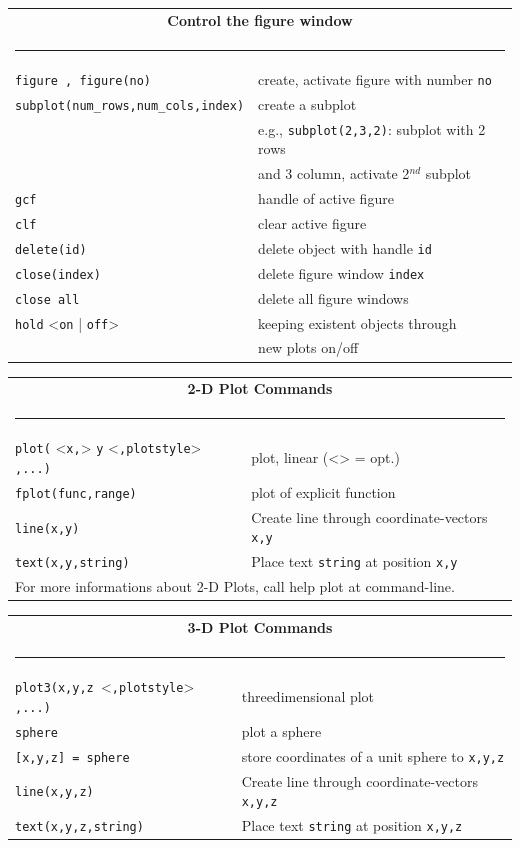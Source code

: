 \begin{tabular}{ll}
\multicolumn{2}{c}{\bf Control the figure window}\\
\multicolumn{2}{c}{\rule{0.97\textwidth}{0pt}}\\[-2ex]\hline
\verb/figure , figure(no)/ & create, activate figure with number \verb/no/\\
\verb/subplot(num_rows,num_cols,index)/ & create a subplot\\
& e.g., \verb/subplot(2,3,2)/: subplot with 2 rows\\
& and 3 column, activate 2$^{nd}$ subplot\\
\verb/gcf/ & handle of active figure\\
\verb/clf/ & clear active figure\\
\verb/delete(id)/ & delete object with handle \verb(id(\\
\verb/close(index)/ & delete figure window \verb(index(\\
\verb/close all /& delete all figure windows\\
\verb/hold/ <\verb/on/ | \verb/off/> & keeping existent objects through\\
& new plots on/off \\
\hline
\end{tabular}

\begin{tabular}{ll}
\multicolumn{2}{c}{\bf 2-D Plot Commands}\\
\multicolumn{2}{c}{\rule{0.97\textwidth}{0pt}}\\[-2ex]\hline
\verb/plot(/ <\verb/x,/> \verb/y/ <\verb/,plotstyle/> \verb/,...)/& plot, linear (<> = opt.)\\
\verb/fplot(func,range)/ & plot of explicit function\\
\verb/line(x,y)/ & Create line through coordinate-vectors \verb/x,y/\\
\verb/text(x,y,string)/ & Place text \verb/string/ at position \verb/x,y/\\
\multicolumn{2}{l}{For more informations about 2-D Plots, call {\ttfamily help plot} at command-line.}\\
\hline
\end{tabular}

\begin{tabular}{ll}
\multicolumn{2}{c}{\bf 3-D Plot Commands}\\
\multicolumn{2}{c}{\rule{0.97\textwidth}{0pt}}\\[-2ex]\hline
\verb/plot3(x,y,z /<\verb/,plotstyle/> \verb/,...)/ & threedimensional plot\\
\verb/sphere/ & plot a sphere\\
\verb/[x,y,z] = sphere/ & store coordinates of a unit sphere to \verb/x,y,z/\\
\verb/line(x,y,z)/ & Create line through coordinate-vectors \verb/x,y,z/\\
\verb/text(x,y,z,string)/ & Place text \verb/string/ at position \verb/x,y,z/\\
\hline
\end{tabular}

